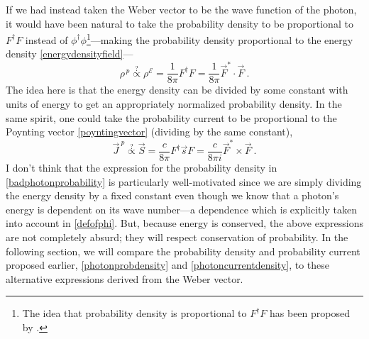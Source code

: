\documentclass[12pt,secnumarabic,amsmath,amssymb,balancelastpage,nofootinbib]{article}
\begin{document}
If we had instead taken the Weber vector to be the wave function of the photon, it would have been natural to take the probability density to be proportional to $F^\dagger F$ instead of $\phi^\dagger \phi$\footnote{The idea that probability density is proportional to $F^\dagger F$ has been proposed by \citet{archibald1955, wesley1984, esposito1999}.}---making the probability density proportional to the energy density \eqref{energydensityfield}---
\begin{equation}
\rho^{\,p}\stackrel{\bm{?}}{\propto}\rho^{\mathcal{E}}=\frac{1}{8\pi} F^\dagger F =\frac{1}{8 \pi}\vec{F}^{*}\!\cdot\vec{F}
\ .
\label{badphotonprobability}
\end{equation}
The idea here is that the energy density can be divided by some constant with units of energy to get an appropriately normalized probability density.  In the same spirit, one could take the probability current to be proportional to the Poynting vector \eqref{poyntingvector} (dividing by the same constant),
\begin{equation}
\vec{J}^{\:p}\stackrel{\bm{?}}{\propto}\vec{S}=\frac{c}{8 \pi} F^\dagger \vec{s} F =\frac{c}{8 \pi i}\vec{F}^* \! \times \! \vec{F}
\ .
\label{badphotoncurrent}
\end{equation}
I don't think that the expression for the probability density in \eqref{badphotonprobability} is particularly well-motivated since we are simply dividing the energy density by a fixed constant even though we know that a photon's energy is dependent on its wave number---a dependence which is explicitly taken into account in \eqref{defofphi}.  But, because energy is conserved, the above expressions are not completely absurd; they will respect conservation of probability.  In the following section, we will compare the probability density and probability current proposed earlier, \eqref{photonprobdensity} and \eqref{photoncurrentdensity}, to these alternative expressions derived from the Weber vector.
\end{document}
